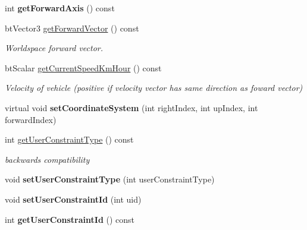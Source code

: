 \begin{DoxyCompactItemize}
\item 
\mbox{\label{classbtRaycastVehicle_ab78aa61c3533ef0369ed6a8304580334}} 
int {\bfseries get\+Forward\+Axis} () const
\item 
\mbox{\label{classbtRaycastVehicle_a24312c6dce6a155b14147170c0eef263}} 
bt\+Vector3 \hyperlink{classbtRaycastVehicle_a24312c6dce6a155b14147170c0eef263}{get\+Forward\+Vector} () const
\begin{DoxyCompactList}\small\item\em Worldspace forward vector. \end{DoxyCompactList}\item 
\mbox{\label{classbtRaycastVehicle_aee54020262c0ff82165ea0e542319906}} 
bt\+Scalar \hyperlink{classbtRaycastVehicle_aee54020262c0ff82165ea0e542319906}{get\+Current\+Speed\+Km\+Hour} () const
\begin{DoxyCompactList}\small\item\em Velocity of vehicle (positive if velocity vector has same direction as foward vector) \end{DoxyCompactList}\item 
\mbox{\label{classbtRaycastVehicle_a505882e9089229da3cea15e6af922a0f}} 
virtual void {\bfseries set\+Coordinate\+System} (int right\+Index, int up\+Index, int forward\+Index)
\item 
\mbox{\label{classbtRaycastVehicle_a1965219f0bc5b07eedb0fb745c890db6}} 
int \hyperlink{classbtRaycastVehicle_a1965219f0bc5b07eedb0fb745c890db6}{get\+User\+Constraint\+Type} () const
\begin{DoxyCompactList}\small\item\em backwards compatibility \end{DoxyCompactList}\item 
\mbox{\label{classbtRaycastVehicle_a552a25a880d5fe75c575800156d591fd}} 
void {\bfseries set\+User\+Constraint\+Type} (int user\+Constraint\+Type)
\item 
\mbox{\label{classbtRaycastVehicle_ab894b724e8b19228b7eea8317e0eb43b}} 
void {\bfseries set\+User\+Constraint\+Id} (int uid)
\item 
\mbox{\label{classbtRaycastVehicle_a4cbba8434f83154a9240b41ab486e72e}} 
int {\bfseries get\+User\+Constraint\+Id} () const
\end{DoxyCompactItemize}
